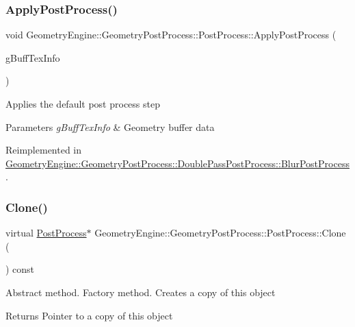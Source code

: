 \subsubsection{\texorpdfstring{ApplyPostProcess()}{ApplyPostProcess()}}
{\footnotesize\ttfamily void Geometry\+Engine\+::\+Geometry\+Post\+Process\+::\+Post\+Process\+::\+Apply\+Post\+Process (\begin{DoxyParamCaption}\item[{const \mbox{\hyperlink{class_geometry_engine_1_1_g_buffer_texture_info}{G\+Buffer\+Texture\+Info}} \&}]{g\+Buff\+Tex\+Info }\end{DoxyParamCaption})\hspace{0.3cm}{\ttfamily [virtual]}}

Applies the default post process step 
\begin{DoxyParams}{Parameters}
{\em g\+Buff\+Tex\+Info} & Geometry buffer data \\
\hline
\end{DoxyParams}


Reimplemented in \mbox{\hyperlink{class_geometry_engine_1_1_geometry_post_process_1_1_double_pass_post_process_1_1_blur_post_process_a41f0c0b0fc02b05fccb8b765acd85ad0}{Geometry\+Engine\+::\+Geometry\+Post\+Process\+::\+Double\+Pass\+Post\+Process\+::\+Blur\+Post\+Process}}.

\mbox{\label{class_geometry_engine_1_1_geometry_post_process_1_1_post_process_aa80749cf09041335f6b3bda3aaf31711}} 
\subsubsection{\texorpdfstring{Clone()}{Clone()}}
{\footnotesize\ttfamily virtual \mbox{\hyperlink{class_geometry_engine_1_1_geometry_post_process_1_1_post_process}{Post\+Process}}$\ast$ Geometry\+Engine\+::\+Geometry\+Post\+Process\+::\+Post\+Process\+::\+Clone (\begin{DoxyParamCaption}{ }\end{DoxyParamCaption}) const\hspace{0.3cm}{\ttfamily [pure virtual]}}

Abstract method. Factory method. Creates a copy of this object \begin{DoxyReturn}{Returns}
Pointer to a copy of this object 
\end{DoxyReturn}


